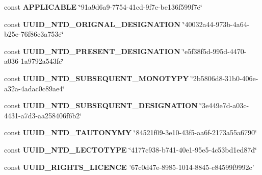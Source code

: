\begin{DoxyCompactItemize}
\item 
\hypertarget{uuids_8php_a919840673af9a09fe088e8458b1f50fc}{const {\bfseries A\-P\-P\-L\-I\-C\-A\-B\-L\-E} \char`\"{}91a9d6a9-\/7754-\/41cd-\/9f7e-\/be136f599f7e\char`\"{}}\label{uuids_8php_a919840673af9a09fe088e8458b1f50fc}

\item 
\hypertarget{uuids_8php_ac71e8cf1a23098cf54e45f29bdcabe8b}{const {\bfseries U\-U\-I\-D\-\_\-\-N\-T\-D\-\_\-\-O\-R\-I\-G\-N\-A\-L\-\_\-\-D\-E\-S\-I\-G\-N\-A\-T\-I\-O\-N} \char`\"{}40032a44-\/973b-\/4a64-\/b25e-\/76f86c3a753c\char`\"{}}\label{uuids_8php_ac71e8cf1a23098cf54e45f29bdcabe8b}

\item 
\hypertarget{uuids_8php_ade5219de2da5347f05cec220f096baab}{const {\bfseries U\-U\-I\-D\-\_\-\-N\-T\-D\-\_\-\-P\-R\-E\-S\-E\-N\-T\-\_\-\-D\-E\-S\-I\-G\-N\-A\-T\-I\-O\-N} \char`\"{}e5f38f5d-\/995d-\/4470-\/a036-\/1a9792a543fc\char`\"{}}\label{uuids_8php_ade5219de2da5347f05cec220f096baab}

\item 
\hypertarget{uuids_8php_add753cd07cf2592b0a599cbc248d24f0}{const {\bfseries U\-U\-I\-D\-\_\-\-N\-T\-D\-\_\-\-S\-U\-B\-S\-E\-Q\-U\-E\-N\-T\-\_\-\-M\-O\-N\-O\-T\-Y\-P\-Y} \char`\"{}2b5806d8-\/31b0-\/406e-\/a32a-\/4adac0c89ae4\char`\"{}}\label{uuids_8php_add753cd07cf2592b0a599cbc248d24f0}

\item 
\hypertarget{uuids_8php_afa92f12e282b286a1af524afe13ebd09}{const {\bfseries U\-U\-I\-D\-\_\-\-N\-T\-D\-\_\-\-S\-U\-B\-S\-E\-Q\-U\-E\-N\-T\-\_\-\-D\-E\-S\-I\-G\-N\-A\-T\-I\-O\-N} \char`\"{}3e449e7d-\/a03c-\/4431-\/a7d3-\/aa258406f6b2\char`\"{}}\label{uuids_8php_afa92f12e282b286a1af524afe13ebd09}

\item 
\hypertarget{uuids_8php_acba7a7a5148badad14fbb73d3b62b684}{const {\bfseries U\-U\-I\-D\-\_\-\-N\-T\-D\-\_\-\-T\-A\-U\-T\-O\-N\-Y\-M\-Y} \char`\"{}84521f09-\/3e10-\/43f5-\/aa6f-\/2173a55a6790\char`\"{}}\label{uuids_8php_acba7a7a5148badad14fbb73d3b62b684}

\item 
\hypertarget{uuids_8php_a2ca7e7b2347914468a1e692aadd6ab74}{const {\bfseries U\-U\-I\-D\-\_\-\-N\-T\-D\-\_\-\-L\-E\-C\-T\-O\-T\-Y\-P\-E} \char`\"{}4177c938-\/b741-\/40e1-\/95e5-\/4c53bd1ed87d\char`\"{}}\label{uuids_8php_a2ca7e7b2347914468a1e692aadd6ab74}

\item 
\hypertarget{uuids_8php_af2d0ed4c251afbefc1a80100d8a54a99}{const {\bfseries U\-U\-I\-D\-\_\-\-R\-I\-G\-H\-T\-S\-\_\-\-L\-I\-C\-E\-N\-C\-E} '67c0d47e-\/8985-\/1014-\/8845-\/c84599f9992c'}\label{uuids_8php_af2d0ed4c251afbefc1a80100d8a54a99}


\end{DoxyCompactItemize}
